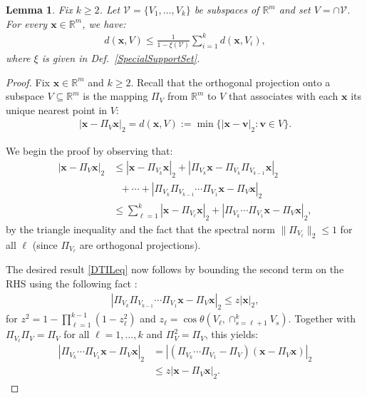 \documentclass[journal, twocolumn]{IEEEtran}
\newtheorem{lemma}{Lemma}
\begin{document}
\begin{lemma}\label{DistanceToIntersectionLemma}
Fix $k \geq 2$. Let $\mathcal{V} = \{V_1, \ldots, V_k\}$ be subspaces of $\mathbb{R}^m$ and set $V = \cap \mathcal{V}$. For every $\mathbf{x} \in \mathbb{R}^m$, we have:
\begin{align}\label{DTILeq}
d(\mathbf{x}, V) \leq \frac{1}{1 - \xi(\mathcal{V})} \sum_{i=1}^k d(\mathbf{x}, V_i),
\end{align}
where $\xi$ is given in Def.~\ref{SpecialSupportSet}.
\end{lemma}
\begin{proof} 
Fix $\mathbf{x} \in \mathbb{R}^m$ and $k \geq 2$. Recall that the orthogonal projection onto a subspace $V \subseteq \mathbb{R}^m$ is the mapping $\Pi_V$ from $\mathbb{R}^m$ to $V$ that associates with each $\mathbf{x}$ its unique nearest point in $V$:
\begin{align*}
|\mathbf{x} - \Pi_V\mathbf{x}|_2 = d(\mathbf{x}, V) := \min\{|\mathbf{x}-\mathbf{v}|_2: \mathbf{v} \in V\}.
\end{align*}

We begin the proof by observing that:
\begin{align*}
|\mathbf{x} - \Pi_V\mathbf{x}|_2 &\leq |\mathbf{x} - \Pi_{V_k} \mathbf{x}|_2 + |\Pi_{V_k}  \mathbf{x} - \Pi_{V_k}\Pi_{V_{k-1}}\mathbf{x}|_2 \nonumber \\
&\ \ \ + \cdots + |\Pi_{V_k} \Pi_{V_{k-1}}\cdots \Pi_{V_1} \mathbf{x} - \Pi_V \mathbf{x}|_2 \nonumber \\
&\leq \sum_{\ell=1}^k |\mathbf{x} - \Pi_{V_{\ell}} \mathbf{x}|_2 + |\Pi_{V_k}\cdots\Pi_{V_{1}} \mathbf{x} - \Pi_V \mathbf{x}|_2,
\end{align*}
%
by the triangle inequality and the fact that the spectral norm $\|\Pi_{V_{\ell}}\|_2 \leq 1$ for all $\ell$ (since $\Pi_{V_{\ell}}$ are orthogonal projections).

The desired result \eqref{DTILeq} now follows by bounding the second term on the RHS using the following fact \cite[Thm.~9.33]{Deutsch12}:
\begin{align}
|\Pi_{V_k}\Pi_{V_{k-1}}\cdots\Pi_{V_1} \mathbf{x} - \Pi_V\mathbf{x}|_2 \leq z |\mathbf{x}|_2, %
\end{align}
for \mbox{$z^2= 1 - \prod_{\ell =1}^{k-1}(1-z_{\ell}^2)$} and \mbox{$z_{\ell} = \cos\theta\left(V_{\ell}, \cap_{s=\ell+1}^k V_s\right)$}. Together with $\Pi_{V_\ell} \Pi_V = \Pi_V$ for all $\ell = 1, \ldots, k$ and $\Pi_V^2 = \Pi_V$, this yields:
\begin{align*}
|\Pi_{V_k} \cdots \Pi_{V_1}\mathbf{x}  - \Pi_V \mathbf{x} |_2 
&= |\left( \Pi_{V_k} \cdots\Pi_{V_1} - \Pi_V \right) (\mathbf{x} - \Pi_V\mathbf{x})|_2 \\
&\leq z|\mathbf{x} - \Pi_V\mathbf{x}|_2.
\end{align*}


\end{proof}
\end{document}
